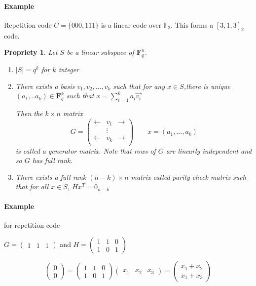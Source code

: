 \documentclass{article}
\newtheorem{prop}{Propriety}
\begin{document}
\paragraph{Example} Repetition code $C=\{000,111\}$ is a linear code over $\mathbb{F}_2$. This forms a $[3,1,3]_2$ code.

\begin{prop}
Let $S$ be a linear subspace of $\mathbf{F}_q^n$.

\begin{enumerate}
\item $|S|=q^k$ for $k$ integer
\item There exists a basis $v_1, v_2,...,v_k$ such that for any $x\in S$,there is unique $(a_1,..a_k)\in \mathbf{F}_q^k$ such that $x=\sum_{i=1}^k a_i \vec{v_i}$

Then the $k\times n$ matrix
\[G= \left( \begin{matrix}
\leftarrow & v_1 & \rightarrow\\
& \vdots & \\
\leftarrow & v_k & \rightarrow\\
\end{matrix}\right) \qquad x=(a_1,...,a_k)\]
is called a generator matrix. Note that rows of $G$ are linearly independent and so $G$ has full rank.
\item There exists a full rank $(n-k)\times n$ matrix called parity check matrix such that for all $x \in S$, $Hx^T=0_{n-k}$
\end{enumerate}
\end{prop}

\paragraph{Example} for repetition code

$G= \left(\begin{matrix} 1&1&1 \end{matrix}\right)$ and $H= \left(\begin{matrix} 1&1&0\\1&0&1 \end{matrix}\right)$

\[ \left(\begin{matrix} 0\\0 \end{matrix}\right) = \left(\begin{matrix} 1&1&0\\1&0&1 \end{matrix}\right)
\left(\begin{matrix} x_1&x_2&x_3 \end{matrix}\right) =
\left(\begin{matrix} x_1+x_2\\ x_1+x_3 \end{matrix}\right)\]
\end{document}
